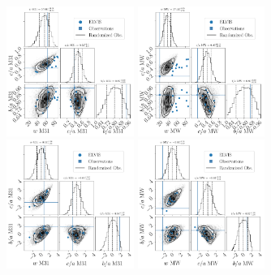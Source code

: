 \documentclass[a4paper,fleqn,usenatbib]{mnras}
\providecommand{\DIFaddbeginFL}{} %
\providecommand{\DIFdelbeginFL}{} %
\providecommand{\DIFdelendFL}{} %
\newcommand{\DIFscaledelfig}{0.5}
\newlength{\DIFdelgraphicswidth} %
\newlength{\DIFdelgraphicsheight} %
\newcommand{\DIFaddincludegraphics}[2][]{{\color{blue}\fbox{\DIFOincludegraphics[#1]{#2}}}} %
\newcommand{\DIFdelincludegraphics}[2][]{%
\sbox{\DIFdelgraphicsbox}{\DIFOincludegraphics[#1]{#2}}%
\settoboxwidth{\DIFdelgraphicswidth}{\DIFdelgraphicsbox} %
\settoboxtotalheight{\DIFdelgraphicsheight}{\DIFdelgraphicsbox} %
\scalebox{\DIFscaledelfig}{%
\parbox[b]{\DIFdelgraphicswidth}{\usebox{\DIFdelgraphicsbox}\\[-\baselineskip] \rule{\DIFdelgraphicswidth}{0em}}\llap{\resizebox{\DIFdelgraphicswidth}{\DIFdelgraphicsheight}{%
\setlength{\unitlength}{\DIFdelgraphicswidth}%
\begin{picture}(1,1)%
\thicklines\linethickness{2pt} %
{\color[rgb]{1,0,0}\put(0,0){\framebox(1,1){}}}%
{\color[rgb]{1,0,0}\put(0,0){\line( 1,1){1}}}%
{\color[rgb]{1,0,0}\put(0,1){\line(1,-1){1}}}%
\end{picture}%
}\hspace*{3pt}}} %
} %
\DeclareRobustCommand{\DIFaddbeginFL}{\DIFOaddbeginFL \let\includegraphics\DIFaddincludegraphics} %
\DeclareRobustCommand{\DIFdelbeginFL}{\DIFOdelbeginFL \let\includegraphics\DIFdelincludegraphics} %
\DeclareRobustCommand{\DIFdelendFL}{\DIFOaddendFL \let\includegraphics\DIFOincludegraphics} %
\begin{document}
\begin{figure}
\centering
\DIFdelbeginFL %
\DIFdelendFL \DIFaddbeginFL \includegraphics[width=0.37\textwidth]{input_elvis_obs_M31_n_11.pdf}
\includegraphics[width=0.37\textwidth]{input_elvis_obs_MW_n_11.pdf}
\includegraphics[width=0.37\textwidth]{input_elvis_obs_M31_n_11_normed.pdf}
\includegraphics[width=0.37\textwidth]{input_elvis_obs_MW_n_11_normed.pdf}

\end{figure}
\end{document}

